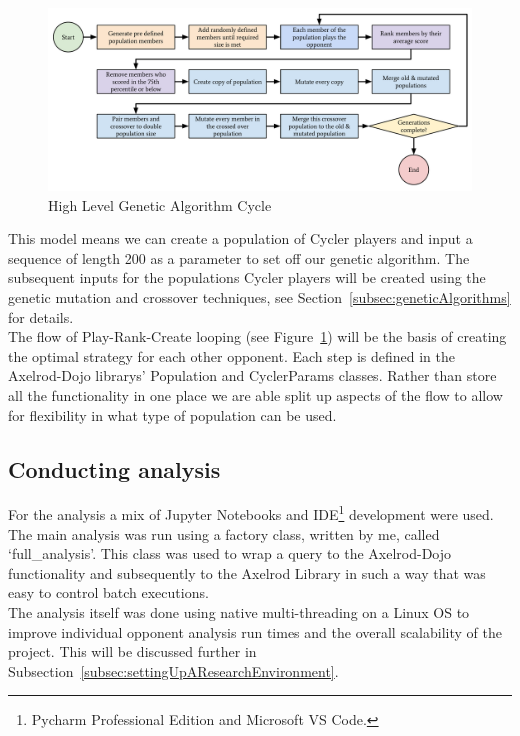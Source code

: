 \begin{figure}[h]
    \includegraphics[width=1.0\textwidth, center]{./img/flows/custom_ga_cycle}
    \caption{High Level Genetic Algorithm Cycle}\label{fig:geneticAlgoCycle}
\end{figure}

This model means we can create a population of Cycler players and input a sequence of length 200 as a parameter to set off our genetic algorithm.
The subsequent inputs for the populations Cycler players will be created using the genetic mutation and crossover techniques, see Section~\ref{subsec:geneticAlgorithms} for details.\\

The flow of Play-Rank-Create looping (see Figure~\ref{fig:geneticAlgoCycle}) will be the basis of creating the optimal strategy for each other opponent.
Each step is defined in the Axelrod-Dojo librarys' Population and CyclerParams classes.
Rather than store all the functionality in one place we are able split up aspects of the flow to allow for flexibility in what type of population can be used.

\subsection{Conducting analysis}\label{subsec:conductingAnalysis}
For the analysis a mix of Jupyter Notebooks and IDE\footnote{Pycharm Professional Edition and Microsoft VS Code.} development were used.
The main analysis was run using a factory class, written by me, called `full\_analysis'.
This class was used to wrap a query to the Axelrod-Dojo functionality and subsequently to the Axelrod Library in such a way that was easy to control batch executions.\\

The analysis itself was done using native multi-threading on a Linux OS to improve individual opponent analysis run times and the overall scalability of the project.
This will be discussed further in Subsection~\ref{subsec:settingUpAResearchEnvironment}.

